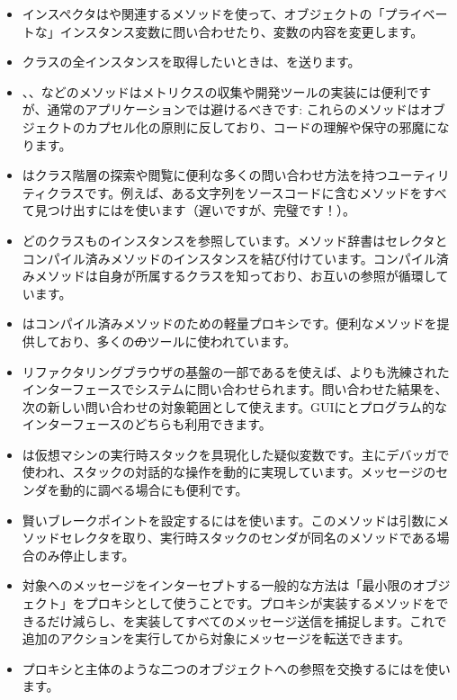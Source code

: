 \documentclass[a4paper,10pt,twoside]{book}
\begin{document}
\begin{itemize}
\item インスペクタはや関連するメソッドを使って、オブジェクトの「プライベートな」インスタンス変数に問い合わせたり、変数の内容を変更します。
\item クラスの全インスタンスを取得したいときは、を送ります。
\item {}、、などのメソッドはメトリクスの収集や開発ツールの実装には便利ですが、通常のアプリケーションでは避けるべきです: これらのメソッドはオブジェクトのカプセル化の原則に反しており、コードの理解や保守の邪魔になります。
\item {}はクラス階層の探索や閲覧に便利な多くの問い合わせ方法を持つユーティリティクラスです。例えば、ある文字列をソースコードに含むメソッドをすべて見つけ出すにはを使います（遅いですが、完璧です！）。
\item どのクラスものインスタンスを参照しています。メソッド辞書はセレクタとコンパイル済みメソッドのインスタンスを結び付けています。コンパイル済みメソッドは自身が所属するクラスを知っており、お互いの参照が循環しています。
\item {}はコンパイル済みメソッドのための軽量プロキシです。便利なメソッドを提供しており、多くの\st のツールに使われています。
\item リファクタリングブラウザの基盤の一部であるを使えば、よりも洗練されたインターフェースでシステムに問い合わせられます。問い合わせた結果を、次の新しい問い合わせの対象範囲として使えます。GUIにとプログラム的なインターフェースのどちらも利用できます。
\item {}は仮想マシンの実行時スタックを具現化した疑似変数です。主にデバッガで使われ、スタックの対話的な操作を動的に実現しています。メッセージのセンダを動的に調べる場合にも便利です。
\item 賢いブレークポイントを設定するにはを使います。このメソッドは引数にメソッドセレクタを取り、実行時スタックのセンダが同名のメソッドである場合のみ停止します。
\item 対象へのメッセージをインターセプトする一般的な方法は「最小限のオブジェクト」をプロキシとして使うことです。プロキシが実装するメソッドをできるだけ減らし、を実装してすべてのメッセージ送信を捕捉します。これで追加のアクションを実行してから対象にメッセージを転送できます。
\item プロキシと主体のような二つのオブジェクトへの参照を交換するにはを使います。

\end{itemize}
\end{document}
